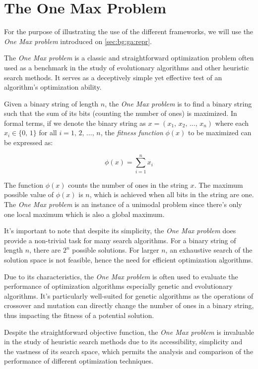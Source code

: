 \section{The One Max Problem}
\label{sota:omp}
  For the purpose of illustrating the use of the different frameworks, we will
  use the \textit{One Max problem} introduced on \vref{sec:bg:ga:repr}.

  The \emph{One Max problem} is a classic and straightforward optimization
  problem often used as a benchmark in the study of evolutionary algorithms and
  other heuristic search methods.
  It serves as a deceptively simple yet effective test of an algorithm's
  optimization ability.

  Given a binary string of length $n$, the \textit{One Max problem} is to find a
  binary string such that the sum of its bits (counting the number of ones) is
  maximized.
  In formal terms, if we denote the binary string as $x = (x_1,\, x_2,\, ...,\,
  x_n)$ where each $x_i \in \{0,\,1\}$ for all $i = 1,\, 2,\, \dots,\, n$, the 
  \textit{fitness function} $\phi(x)$ to be maximized can be expressed as:

  \begin{equation}
    \phi(x) = \sum_{i=1}^{n} x_i
  \end{equation}

  The function $\phi(x)$ counts the number of ones in the string $x$.
  The maximum possible value of $\phi(x)$ is $n$, which is achieved when all 
  bits in the string are one.
  The \textit{One Max problem} is an instance of a unimodal problem since
  there's only one local maximum which is also a global maximum.

  It's important to note that despite its simplicity, the \textit{One Max
  problem} does provide a non-trivial task for many search algorithms.
  For a binary string of length $n$, there are $2^n$ possible solutions.
  For larger $n$, an exhaustive search of the solution space is not feasible,
  hence the need for efficient optimization algorithms.

  Due to its characteristics, the \textit{One Max problem} is often used to
  evaluate the performance of optimization algorithms especially genetic and
  evolutionary algorithms.
  It's particularly well-suited for genetic algorithms as the operations of
  crossover and mutation can directly change the number of ones in a binary
  string, thus impacting the fitness of a potential solution.

  Despite the straightforward objective function, the \textit{One Max problem} is
  invaluable in the study of heuristic search methods due to its accessibility,
  simplicity and the vastness of its search space, which permits the analysis
  and comparison of the performance of different optimization techniques.
